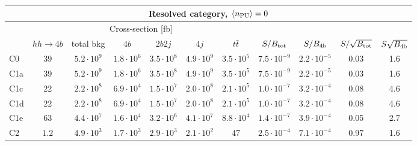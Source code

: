 \begin{tabular}{|l|cc|cccc|cccc|}
  \hline
\multicolumn{11}{|c|}{Resolved category, $\left\langle n_{\rm PU}\right\rangle=0$}\\
\hline
&  \multicolumn{6}{c|}{Cross-section [fb]} &  &  & &  \\
   &  $hh\to 4b$ &  total bkg  &   $4b$    &  $2b2j$   &   $4j$    &
$t\bar{t}$ &
$S/B_{\rm tot}$ & $S/B_{\rm 4b}$ & $S/\sqrt{B_{\rm tot}}$ & $S\sqrt{B_{\rm 4b}}$ \\
  \hline
  \hline
 C0    & $39$  &   $5.2\cdot 10^9$   & $1.8\cdot 10^6$ & $3.5\cdot 10^8$ & $4.9\cdot 10^9$ & $3.5\cdot 10^5$  & $7.5\cdot 10^{-9}$   &  $2.2\cdot 10^{-5}$  &   0.03   & 1.6        \\
 C1a   & $39$  &   $5.2\cdot 10^9$   & $1.8\cdot 10^6$ & $3.5\cdot 10^8$ & $4.9\cdot 10^9$ & $3.5\cdot 10^5$ &  $7.5\cdot 10^{-9}$   & $2.2\cdot 10^{-5}$   &     0.03   & 1.6       \\
 C1c   & $22$  &   $2.2\cdot 10^8$   & $6.9\cdot 10^4$ & $1.5\cdot 10^7$ & $2.0\cdot 10^8$ & $2.1\cdot 10^5$ &  $1.0\cdot 10^{-7}$  &  $3.2\cdot 10^{-4}$  &  0.08   & 4.6         \\
 C1d   & $22$  &   $2.2\cdot 10^8$   & $6.9\cdot 10^4$ & $1.5\cdot 10^7$ & $2.0\cdot 10^8$ & $2.1\cdot 10^5$ &  $1.0\cdot 10^{-7}$  & $3.2\cdot 10^{-4}$   &  0.08   & 4.6         \\
 C1e   & $63$  &   $4.4\cdot 10^7$   & $1.6\cdot 10^4$ & $3.2\cdot 10^6$ & $4.1\cdot 10^7$ & $8.8\cdot 10^4$ &   $1.4\cdot 10^{-7}$  &  $3.9\cdot 10^{-4}$   &   0.05   & 2.7         \\
 C2    & $1.2$  &   $4.9\cdot 10^3$   & $1.7\cdot 10^3$ & $2.9\cdot 10^3$ & $2.1\cdot 10^2$ & $47$ &            $ 2.5\cdot 10^{-4}$   & $7.1\cdot 10^{-4}$   &   0.97   & 1.6       \\
\hline
\end{tabular}
